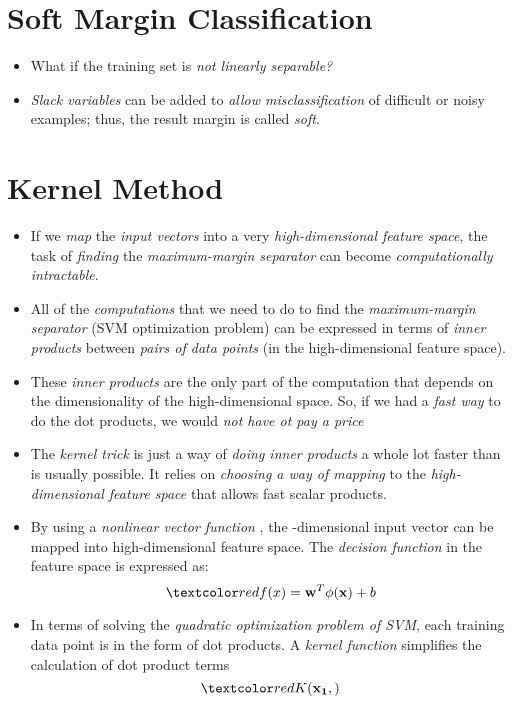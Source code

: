 \documentclass[
	number={2},
	title={Learning Linear Separators{,} SVMs and Kernels}
]{cs584notes}
\begin{document}
\section{Soft Margin Classification}\label{sec:soft-margin-classification}
\begin{itemize}
	\item What if the training set is \emph{not linearly separable?}
	\item \emph{Slack variables} can be added to \emph{allow misclassification} of difficult or noisy examples; thus, the result margin is called \emph{soft}.
\end{itemize}

\section{Kernel Method}
\begin{itemize}
	\item If we \emph{map} the \emph{input vectors} into a very \emph{high-dimensional feature space}, the task of \emph{finding} the \emph{maximum-margin separator} can become \emph{computationally intractable}.
	\item All of the \emph{computations} that we need to do to find the \emph{maximum-margin separator} (SVM optimization problem) can be expressed in terms of \emph{inner products} between \emph{pairs of data points} (in the high-dimensional feature space).
	\item These \emph{inner products} are the only part of the computation that depends on the dimensionality of the high-dimensional space.
	So, if we had a \emph{fast way} to do the dot products, we would \emph{not have ot pay a price}
	\item The \emph{kernel trick} is just a way of \emph{doing inner products} a whole lot faster than is usually possible.
	It relies on \emph{choosing a way of mapping} to the \emph{high-dimensional feature space} that allows fast scalar products.
	\item By using a \emph{nonlinear vector function} , the -dimensional input vector  can be mapped into high-dimensional feature space.
	The \emph{decision function} in the feature space is expressed as:
	\[ \data{ f(x) = \vec{w}^{T}\phi(\vec{x}) + b } \]
	\item In terms of solving the \emph{quadratic optimization problem of SVM}, each training data point is in the form of dot products.
	A \emph{kernel function}  simplifies the calculation of dot product terms
	\[ \data{K(\vec{x_{1},)}} \] %

\end{itemize}
\end{document}
